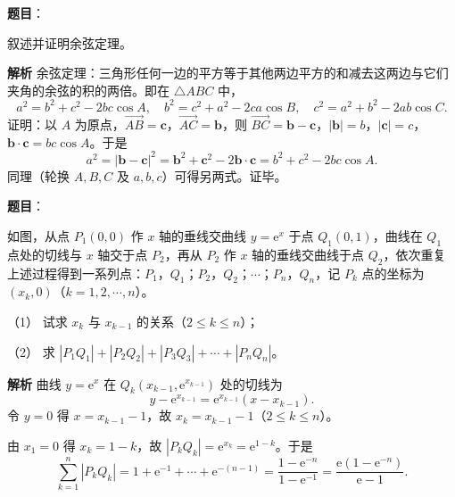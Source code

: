 \begin{answer}

\textbf{题目}：

叙述并证明余弦定理。

\textbf{解析}
余弦定理：三角形任何一边的平方等于其他两边平方的和减去这两边与它们夹角的余弦的积的两倍。即在 $\triangle ABC$ 中，
\nopagebreak[4]
\[a^2=b^2+c^2-2bc\cos A,\quad b^2=c^2+a^2-2ca\cos B,\quad c^2=a^2+b^2-2ab\cos C.\]
证明：以 $A$ 为原点，$\overrightarrow{AB}=\boldsymbol c$，$\overrightarrow{AC}=\boldsymbol b$，则 $\overrightarrow{BC}=\boldsymbol b-\boldsymbol c$，$|\boldsymbol b|=b$，$|\boldsymbol c|=c$，$\boldsymbol b\cdot\boldsymbol c=bc\cos A$。于是
\nopagebreak[4]
\[a^2=|\boldsymbol b-\boldsymbol c|^2=\boldsymbol b^2+\boldsymbol c^2-2\boldsymbol b\cdot\boldsymbol c=b^2+c^2-2bc\cos A.\]
同理（轮换 $A,B,C$ 及 $a,b,c$）可得另两式。证毕。


\end{answer}
\begin{answer}

\textbf{题目}：

如图，从点 $P_1(0,0)$ 作 $x$ 轴的垂线交曲线 $y=\mathrm e^x$ 于点 $Q_1(0,1)$，曲线在 $Q_1$ 点处的切线与 $x$ 轴交于点 $P_2$，再从 $P_2$ 作 $x$ 轴的垂线交曲线于点 $Q_2$，依次重复上述过程得到一系列点：$P_1$，$Q_1$；$P_2$，$Q_2$；$\cdots$；$P_n$，$Q_n$，记 $P_k$ 点的坐标为 $(x_k,0)$（$k=1,2,\cdots,n$）。

（1） 试求 $x_k$ 与 $x_{k-1}$ 的关系（$2\leqslant k\leqslant n$）；

（2） 求 $|P_1Q_1|+|P_2Q_2|+|P_3Q_3|+\cdots+|P_nQ_n|$。
\nopagebreak[4]
\begin{center}\end{center}
\nopagebreak[4]
\textbf{解析}
曲线 $y=\mathrm e^x$ 在 $Q_k\left(x_{k-1},\mathrm e^{x_{k-1}}\right)$ 处的切线为
\nopagebreak[4]
\[y-\mathrm e^{x_{k-1}}=\mathrm e^{x_{k-1}}\left(x-x_{k-1}\right).\]
令 $y=0$ 得 $x=x_{k-1}-1$，故 $x_k=x_{k-1}-1$（$2\leqslant k\leqslant n$）。

由 $x_1=0$ 得 $x_k=1-k$，故 $|P_kQ_k|=\mathrm e^{x_k}=\mathrm e^{1-k}$。于是
\nopagebreak[4]
\[\sum_{k=1}^n|P_kQ_k|=1+\mathrm e^{-1}+\cdots+\mathrm e^{-(n-1)}=\frac{1-\mathrm e^{-n}}{1-\mathrm e^{-1}}=\frac{\mathrm e\left(1-\mathrm e^{-n}\right)}{\mathrm e-1}.\]



\end{answer}
